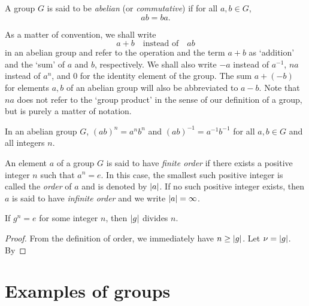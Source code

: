 \begin{definition}
    A group \(G\) is said to be \emph{abelian} (or \emph{commutative}) if for
    all \(a, b \in G\),
    \[
        ab = ba.
    \]
\end{definition}

\begin{remark}
    As a matter of convention, we shall write
    \[
        a + b \quad \text{instead of} \quad ab
    \]
    in an abelian group and refer to the operation and the term \(a + b\) as
    `addition' and the `sum' of \(a\) and \(b\), respectively. We shall also
    write \(-a\) instead of \(a^{-1}\), \(na\) instead of \(a^n\), and \(0\) for
    the identity element of the group. The sum \(a + (-b)\) for elements \(a,
    b\) of an abelian group will also be abbreviated to \(a - b\). Note that
    \(na\) does not refer to the `group product' in the sense of our definition
    of a group, but is purely a matter of notation.
\end{remark}

\begin{theorem}
    In an abelian group \(G\), \((ab)^n = a^n b^n\) and \((ab)^{-1} = a^{-1}
    b^{-1}\) for all \(a, b \in G\) and all integers \(n\).
\end{theorem}

\begin{definition}
    An element \(a\) of a group \(G\) is said to have \emph{finite order} if
    there exists a positive integer \(n\) such that \(a^n = e\). In this case,
    the smallest such positive integer is called the \emph{order} of \(a\) and
    is denoted by \(\lvert a \rvert\). If no such positive integer exists, then \(a\)
    is said to have \emph{infinite order} and we write \(\lvert a \rvert = \infty\).
\end{definition}

\begin{theorem}
    If \(g^n = e\) for some integer \(n\), then \(\lvert g \rvert\) divides \(n\).
\end{theorem}

\begin{proof}
    From the definition of order, we immediately have \(n \geq \lvert g \rvert\). Let
    \(\nu = \lvert g \rvert\). By 
\end{proof}


\section{Examples of groups}

